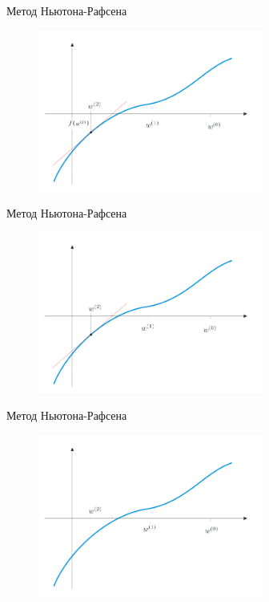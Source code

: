 \documentclass[10pt]{beamer}
\begin{document}
\begin{frame}{Метод Ньютона-Рафсена}
	\begin{figure}[htbp]
	  \includegraphics[height=150pt, keepaspectratio = true]{images/newton-11}   
	\end{figure}
\end{frame}

\begin{frame}{Метод Ньютона-Рафсена}
	\begin{figure}[htbp]
	  \includegraphics[height=150pt, keepaspectratio = true]{images/newton-12}   
	\end{figure}
\end{frame}

\begin{frame}{Метод Ньютона-Рафсена}
	\begin{figure}[htbp]
	  \includegraphics[height=150pt, keepaspectratio = true]{images/newton-13}   
	\end{figure}
\end{frame}
\end{document}
